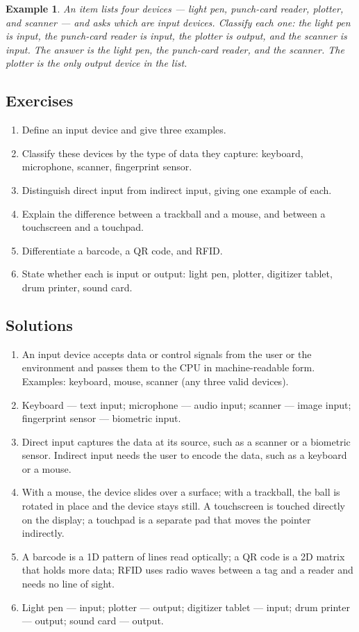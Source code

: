 \documentclass[11pt]{article}
\newtheorem{example}{Example}[section]
\begin{document}
\begin{example}
An item lists four devices --- light pen, punch-card reader, plotter, and
scanner --- and asks which are input devices. Classify each one: the light
pen is input, the punch-card reader is input, the plotter is output, and the
scanner is input. The answer is the light pen, the punch-card reader, and the
scanner. The plotter is the only output device in the list.
\end{example}

\subsection*{Exercises}
\begin{enumerate}[label=\arabic*.]
  \item Define an input device and give three examples.
  \item Classify these devices by the type of data they capture: keyboard,
    microphone, scanner, fingerprint sensor.
  \item Distinguish direct input from indirect input, giving one example of
    each.
  \item Explain the difference between a trackball and a mouse, and between a
    touchscreen and a touchpad.
  \item Differentiate a barcode, a QR code, and RFID.
  \item State whether each is input or output: light pen, plotter, digitizer
    tablet, drum printer, sound card.
\end{enumerate}

\subsection*{Solutions}
\begingroup\small
\begin{enumerate}[label=\arabic*.]
  \item An input device accepts data or control signals from the user or the
    environment and passes them to the CPU in machine-readable form.
    Examples: keyboard, mouse, scanner (any three valid devices).
  \item Keyboard --- text input; microphone --- audio input; scanner ---
    image input; fingerprint sensor --- biometric input.
  \item Direct input captures the data at its source, such as a scanner or a
    biometric sensor. Indirect input needs the user to encode the data, such
    as a keyboard or a mouse.
  \item With a mouse, the device slides over a surface; with a trackball, the
    ball is rotated in place and the device stays still. A touchscreen is
    touched directly on the display; a touchpad is a separate pad that moves
    the pointer indirectly.
  \item A barcode is a 1D pattern of lines read optically; a QR code is a 2D
    matrix that holds more data; RFID uses radio waves between a tag and a
    reader and needs no line of sight.
  \item Light pen --- input; plotter --- output; digitizer tablet --- input;
    drum printer --- output; sound card --- output.
\end{enumerate}
\endgroup
\end{document}
